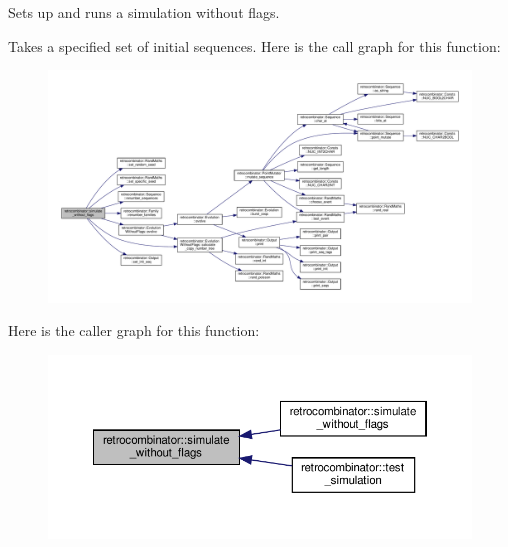 Sets up and runs a simulation without flags. 

Takes a specified set of initial sequences. Here is the call graph for this function\+:
\nopagebreak
\begin{figure}[H]
\begin{center}
\leavevmode
\includegraphics[width=350pt]{namespaceretrocombinator_ab4bb894621063b932d80c1473b359534_cgraph}
\end{center}
\end{figure}
Here is the caller graph for this function\+:
\nopagebreak
\begin{figure}[H]
\begin{center}
\leavevmode
\includegraphics[width=350pt]{namespaceretrocombinator_ab4bb894621063b932d80c1473b359534_icgraph}
\end{center}
\end{figure}
\mbox{\label{namespaceretrocombinator_a0dc31e2b9d6473e995395d8171f56312}} 
